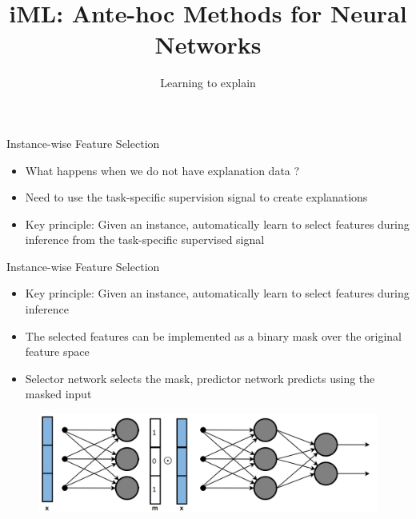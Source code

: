 \documentclass[11pt,compress,t,notes=noshow, aspectratio=169, xcolor=table]{beamer}
\title{iML: Ante-hoc Methods for Neural Networks}
\subtitle{Learning to explain}
\begin{document}
	\maketitle
	\graphicspath{ {./figure/} }
	
\begin{frame}[c]{Instance-wise Feature Selection}
    \begin{itemize}
        \item What happens when we do not have explanation data ?
        \bigskip
        \item Need to use the task-specific supervision signal to create explanations
        \bigskip
        \item Key principle: Given an instance, automatically learn to select features during inference
from the task-specific supervised signal
    \end{itemize}
\end{frame}	
	
\begin{frame}{Instance-wise Feature Selection}
    \begin{itemize}
        \item Key principle: Given an instance, automatically learn to select features during inference
        \item The selected features can be implemented as a binary mask over the original feature
space
\item Selector network selects the mask, predictor network predicts using the masked input
    \end{itemize}
    \begin{figure}
        \centering
        \includegraphics[scale=.45]{bild16}
    \end{figure}
\end{frame}
	
\end{document}
